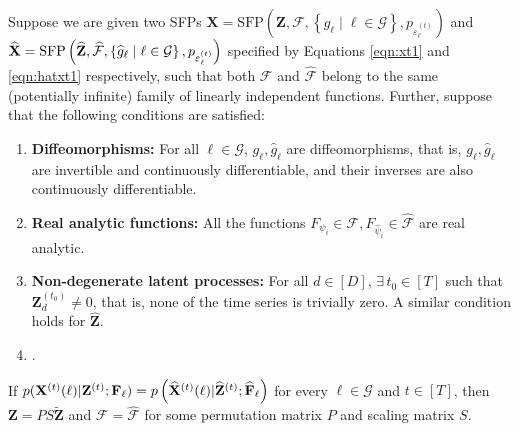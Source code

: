 \begin{theorem}
    Suppose we are given two SFPs $\mathbf{X} = \text{SFP}\left(\mathbf{Z}, \mathcal{F}, \left\{ g_{\ell} \mid \ell \in \mathcal{G} \right\}, p_{\varepsilon_{\ell}^{(t)}} \right)$ and $\widehat{\mathbf{X}} = \text{SFP}\left(\widehat{\mathbf{Z}}, \widehat{\mathcal{F}}, \left\{\widehat{g}_{\ell} \mid \ell \in \mathcal{G} \right\}, {p_{{\varepsilon}_{\ell}^{(t)}}} \right)$ specified by Equations \ref{eqn:xt1} and \ref{eqn:hatxt1} respectively, such that both $\mathcal{F}$ and $\widehat{\mathcal{F}}$ belong to the same (potentially infinite) family of linearly independent functions. Further, suppose that the following conditions are satisfied: 
    \begin{enumerate}
        \item \textbf{Diffeomorphisms:} For all $\ell \in \mathcal{G}$, $\displaystyle g_{\ell}, \widehat{g}_{\ell}$ are diffeomorphisms, that is, $g_{\ell}, \widehat{g}_{\ell}$ are invertible and continuously differentiable, and their inverses are also continuously differentiable.
        \item \textbf{Real analytic functions:} All the functions $F_{\psi_i} \in \mathcal{F}, F_{\widehat{\psi}_i} \in \widehat{\mathcal{F}}$ are real analytic. 
        \item \textbf{Non-degenerate latent processes:} For all $d \in [D]$,  $\exists \,  t_0 \in [T]$ such that $\mathbf{Z}^{(t_0)}_d \neq 0$, that is, none of the time series is trivially zero. A similar condition holds for $\widehat{\mathbf{Z}}$.
        \item {}.
    \end{enumerate}
     If $p(\mathbf{X}^{(t)}(\ell) | \mathbf{Z}^{(t)} ; \mathbf{F}_{\ell}) = p \left(\widehat{\mathbf{X}}^{(t)}(\ell)| \widehat{\mathbf{Z}}^{(t)}; \widehat{\mathbf{F}}_{\ell} \right)$ for every $\ell \in \mathcal{G}$ and $t \in [T]$, then $\mathbf{Z} = PS\tilde{\mathbf{Z}}$ and $\mathcal{F} = \widehat{\mathcal{F}}$ for some permutation matrix $P$ and scaling matrix $S$. \label{thm:sfp_identifiability}
\end{theorem}

